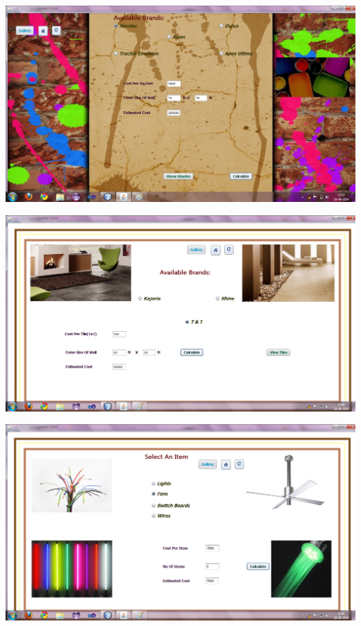 \documentclass[12pt,a4paper]{report}
\begin{document}
\begin{center}
\includegraphics[scale=0.45]{4.png}
\end{center}
\begin{center}
\includegraphics[scale=0.45]{5.png}
\end{center}
\begin{center}
\includegraphics[scale=0.45]{6.png}
\end{center}
\end{document}
